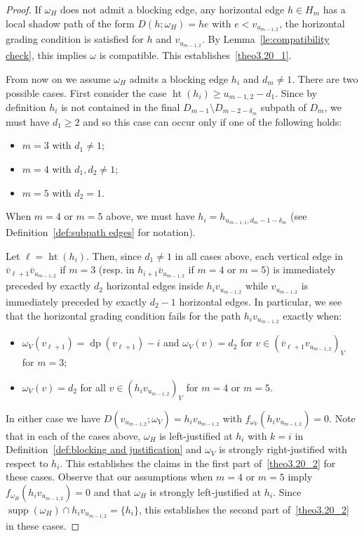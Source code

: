 \documentclass[ALCO,ThmDefs,Unicode,epreuves]{cedram}
\DeclareMathOperator{\hgt}{ht}
\DeclareMathOperator{\dpt}{dp}
\DeclareMathOperator{\supp}{supp}
\begin{document}
\begin{proof}
 If $\omega_H$ does not admit a blocking edge, any horizontal edge $h\in H_m$ has a local shadow path of the form $D(h;\omega_H)=he$ with $e<v_{u_{m-1,2}}$, \ie the horizontal grading condition is satisfied for $h$ and $v_{u_{m-1,2}}$. By Lemma~\ref{le:compatibility check}, this implies $\omega$ is compatible. 
 This establishes~\ref{theo3.20_1}. 
 
 From now on we assume $\omega_H$ admits a blocking edge $h_i$ and $d_m\ne1$. 
 There are two possible cases.
 First consider the case $\hgt(h_i)\ge u_{m-1,2}-d_1$.
 Since by definition $h_i$ is not contained in the final $D_{m-1}\setminus D_{m-2-\delta_m}$ subpath of $D_m$, we must have $d_1\ge2$ and so this case can occur only if one of the following holds:
 \begin{itemize}
 \item $m=3$ with $d_1\ne1$;
 \item $m=4$ with $d_1,d_2\ne1$;
 \item $m=5$ with $d_2=1$.
 \end{itemize}
 When $m=4$ or $m=5$ above, we must have $h_i=h_{u_{m-1,1},d_m-1-\delta_m}$ (see Definition~\ref{def:subpath edges} for notation).

 Let $\ell=\hgt(h_i)$.
 Then, since $d_1\ne1$ in all cases above, each vertical edge in $\overline{v}_{\ell+1}\overline{v}_{u_{m-1,2}}$ if $m=3$ (resp. in $h_{i+1}\overline{v}_{u_{m-1,2}}$ if $m=4$ or $m=5$) is immediately preceded by exactly $d_2$ horizontal edges inside $h_iv_{u_{m-1,2}}$ while $v_{u_{m-1,2}}$ is immediately preceded by exactly $d_2-1$ horizontal edges.
 In particular, we see that the horizontal grading condition fails for the path $h_iv_{u_{m-1,2}}$ exactly when:
 \begin{itemize}
 \item $\omega_V(v_{\ell+1})=\dpt(v_{\ell+1})-i$ and $\omega_V(v)=d_2$ for $v\in(\overline{v}_{\ell+1}v_{u_{m-1,2}})_V$ for $m=3$;
 \item $\omega_V(v)=d_2$ for all $v\in(h_iv_{u_{m-1,2}})_V$ for $m=4$ or $m=5$.
 \end{itemize}
 In either case we have $D(v_{u_{m-1,2}};\omega_V)=h_iv_{u_{m-1,2}}$ with $f_{\omega_V}(h_iv_{u_{m-1,2}})=0$.
 Note that in each of the cases above, $\omega_H$ is left-justified at $h_i$ with $k=i$ in Definition~\ref{def:blocking and justification} and $\omega_V$ is strongly right-justified with respect to $h_i$.
 This establishes the claims in the first part of~\ref{theo3.20_2} for these cases.
 Observe that our assumptions when $m=4$ or $m=5$ imply $f_{\omega_H}(h_iv_{u_{m-1,2}})=0$ and that $\omega_H$ is strongly left-justified at $h_i$.
 Since $\supp(\omega_H)\cap h_iv_{u_{m-1,2}}=\{h_i\}$, this establishes the second part of~\ref{theo3.20_2} in these cases.
 

\end{proof}
\end{document}
